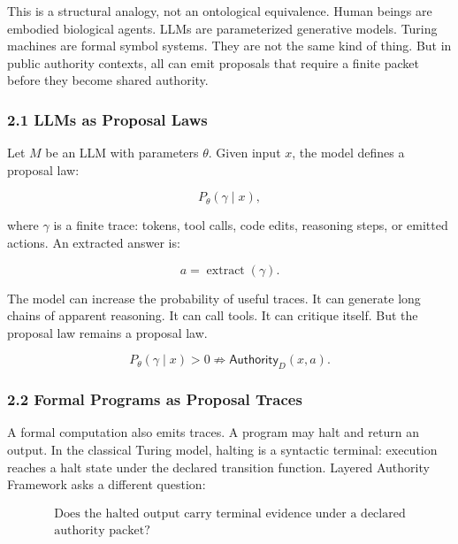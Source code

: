 \documentclass[
  10pt,
]{article}
\begin{document}
This is a structural analogy, not an ontological equivalence. Human beings are embodied biological agents. LLMs are parameterized generative models. Turing machines are formal symbol systems. They are not the same kind of thing. But in public authority contexts, all can emit proposals that require a finite packet before they become shared authority.

\subsubsection{2.1 LLMs as Proposal Laws}\label{llms-as-proposal-laws}

Let \protect\hypertarget{math-E0017-0023}{}{\(M\)} be an LLM with parameters \protect\hypertarget{math-E0018-0024}{}{\(\theta\)}. Given input \protect\hypertarget{math-E0019-0025}{}{\(x\)}, the model defines a proposal law:

\protect\hypertarget{math-E0020-0026}{}{\[
P_\theta(\gamma\mid x),
\]}

where \protect\hypertarget{math-E0021-0027}{}{\(\gamma\)} is a finite trace: tokens, tool calls, code edits, reasoning steps, or emitted actions. An extracted answer is:

\protect\hypertarget{math-E0022-0028}{}{\[
a=\operatorname{extract}(\gamma).
\]}

The model can increase the probability of useful traces. It can generate long chains of apparent reasoning. It can call tools. It can critique itself. But the proposal law remains a proposal law.

\protect\hypertarget{math-E0023-0029}{}{\[
\boxed{
P_\theta(\gamma\mid x)>0
\not\Rightarrow
\mathsf{Authority}_D(x,a).
}
\]}

\subsubsection{2.2 Formal Programs as Proposal Traces}\label{formal-programs-as-proposal-traces}

A formal computation also emits traces. A program may halt and return an output. In the classical Turing model, halting is a syntactic terminal: execution reaches a halt state under the declared transition function. Layered Authority Framework asks a different question:

\protect\hypertarget{math-E0024-0030}{}{\[
\boxed{
\begin{gathered}\text{Does the halted output carry terminal evidence under a declared}\\
\text{authority packet?}\end{gathered}
}
\]}
\end{document}
